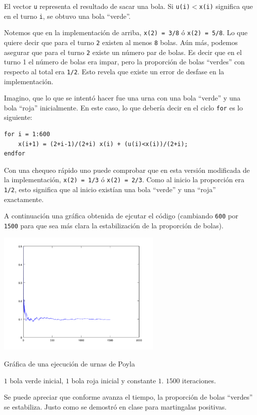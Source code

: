 El vector \texttt{u} representa el resultado de sacar una bola. Si \texttt{u(i)$<$x(i)} significa que en el turno \texttt{i}, 
se obtuvo una bola ``verde''.\pn

Notemos que en la implementación de arriba, \texttt{x(2) = 3/8} ó \texttt{x(2) = 5/8}. Lo que quiere decir que para 
el turno \texttt{2} existen al menos \texttt{8} bolas. Aún más, podemos asegurar que para el turno \texttt{2} existe 
un número par de bolas. Es decir que en el turno 1 el número de bolas era impar, pero la proporción de bolas ``verdes'' 
con respecto al total era \texttt{1/2}. Esto revela que existe un error de desfase en la implementación.\pn 

Imagino, que lo que se intentó hacer fue una urna con una bola ``verde'' y una bola ``roja'' inicialmente. En este caso, lo que 
debería decir en el ciclo \texttt{for} es lo siguiente:\pn

\begin{verbatim}
for i = 1:600
    x(i+1) = (2+i-1)/(2+i) x(i) + (u(i)<x(i))/(2+i);
endfor
\end{verbatim}\pn

Con una chequeo rápido uno puede comprobar que en esta versión modificada de la implementación, 
\texttt{x(2) = 1/3} ó \texttt{x(2) = 2/3}. Como al inicio la proporción era \texttt{1/2}, esto 
significa que al inicio existían una bola ``verde'' y una ``roja'' exactamente.\pn

A continuación una gráfica obtenida de ejcutar el código (cambiando \texttt{600} por \texttt{1500} para que 
sea más clara la estabilización de la proporción de bolas).

\begin{center}
    \includegraphics[width=8cm]{tarea2/problema2_2/poyla.PNG}
\end{center}
\begin{center}
    Gráfica de una ejecución de urnas de Poyla \par
    $1$ bola verde inicial, $1$ bola roja inicial y constante $1$. $1500$ iteraciones.
\end{center}\pn

Se puede apreciar que conforme avanza el tiempo, la proporción de bolas ``verdes'' se estabiliza. Justo como se demostró en clase para
martingalas positivas.
